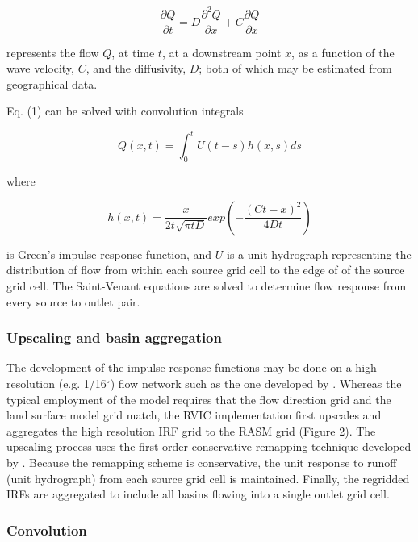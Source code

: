 \documentclass[ms, draft]{agutex}
\begin{document}
\begin{article}
 \begin{equation}
     \frac{\partial Q}{\partial t} = D \frac{\partial^2 Q}{\partial x} + C \frac{\partial Q}{\partial x}
 \end{equation}

represents the flow $Q$, at time $t$, at a downstream point $x$, as a function of the wave velocity, $C$, and the diffusivity, $D$; both of which may be estimated from geographical data.

Eq. (1) can be solved with convolution integrals

 \begin{equation}
	Q(x,t) = \int_0^t U(t-s)h(x,s)ds
 \end{equation}

where

 \begin{equation}
	h(x, t) = \frac{x}{2t\sqrt{\pi tD}}exp\left(-\frac{(Ct-x)^2}{4Dt}\right)
 \end{equation}

is Green’s impulse response function, and $U$ is a unit hydrograph representing the distribution of flow from within each source grid cell to the edge of of the source grid cell.
The Saint-Venant equations are solved to determine flow response from every source to outlet pair.

\subsubsection{Upscaling and basin aggregation}

The development of the impulse response functions may be done on a high resolution (e.g. 1/16$^{\circ}$) flow network such as the one developed by \citet{Wu_2011}.
Whereas the typical employment of the \citet{Lohmann_1996} model requires that the flow direction grid and the land surface model grid match, the RVIC implementation first upscales and aggregates the high resolution IRF grid to the RASM grid (Figure 2).
The upscaling process uses the first-order conservative remapping technique developed by \citep{Jones_1999}.
Because the remapping scheme is conservative, the unit response to runoff (unit hydrograph) from each source grid cell is maintained.
Finally, the regridded IRFs are aggregated to include all basins flowing into a single outlet grid cell.

\subsubsection{Convolution}


\end{article}
\end{document}
